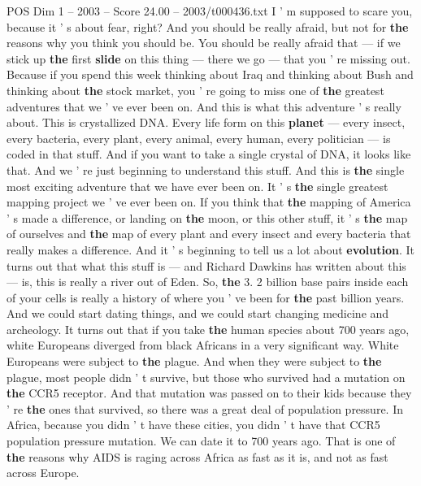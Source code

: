 \begin{textsample}{POS Dim 1 – 2003 – Score 24.00 – 2003/t000436.txt}  \label{ex:f1_pos_002}
I ' m supposed to scare you, because it ' s about fear, right?
And you should be really afraid, but not for \textbf{the} reasons why you think you should be.
You should be really afraid that — if we stick up \textbf{the} first \textbf{slide} on this thing — there we go — that you ' re missing out.
Because if you spend this week thinking about Iraq and thinking about Bush and thinking about \textbf{the} stock market, you ' re going to miss one of \textbf{the} greatest adventures that we ' ve ever been on.
And this is what this adventure ' s really about.
This is crystallized DNA.
Every life form on this \textbf{planet} — every insect, every bacteria, every plant, every animal, every human, every politician — is coded in that stuff.
And if you want to take a single crystal of DNA, it looks like that.
And we ' re just beginning to understand this stuff.
And this is \textbf{the} single most exciting adventure that we have ever been on.
It ' s \textbf{the} single greatest mapping project we ' ve ever been on.
If you think that \textbf{the} mapping of America ' s made a difference, or landing on \textbf{the} moon, or this other stuff, it ' s \textbf{the} map of ourselves and \textbf{the} map of every plant and every insect and every bacteria that really makes a difference.
And it ' s beginning to tell us a lot about \textbf{evolution}.
It turns out that what this stuff is — and Richard Dawkins has written about this — is, this is really a river out of Eden.
So, \textbf{the} 3. 2 billion base pairs inside each of your cells is really a history of where you ' ve been for \textbf{the} past billion years.
And we could start dating things, and we could start changing medicine and archeology.
It turns out that if you take \textbf{the} human species about 700 years ago, white Europeans diverged from black Africans in a very significant way.
White Europeans were subject to \textbf{the} plague.
And when they were subject to \textbf{the} plague, most people didn ' t survive, but those who survived had a mutation on \textbf{the} CCR5 receptor.
And that mutation was passed on to their kids because they ' re \textbf{the} ones that survived, so there was a great deal of population pressure.
In Africa, because you didn ' t have these cities, you didn ' t have that CCR5 population pressure mutation.
We can date it to 700 years ago.
That is one of \textbf{the} reasons why AIDS is raging across Africa as fast as it is, and not as fast across Europe.

\end{textsample}
